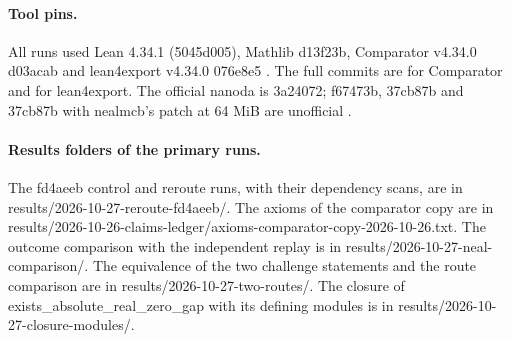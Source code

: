 \paragraph{Tool pins.}
All runs used Lean 4.34.1 (5045d005), Mathlib d13f23b, Comparator v4.34.0 d03acab and lean4export v4.34.0 076e8e5 \cite{lean4,mathlib,comparator,lean4export}. %
The full commits are  for Comparator and  for lean4export. %
The official nanoda is 3a24072; f67473b, 37cb87b and 37cb87b with nealmcb's patch at 64 MiB are unofficial \cite{nanoda-lib}. %

\paragraph{Results folders of the primary runs.}
The fd4aeeb control and reroute runs, with their dependency scans, are in results/2026-10-27-reroute-fd4aeeb/. %
The axioms of the comparator copy are in results/2026-10-26-claims-ledger/axioms-comparator-copy-2026-10-26.txt. %
The outcome comparison with the independent replay is in results/2026-10-27-neal-comparison/. %
The equivalence of the two challenge statements and the route comparison are in results/2026-10-27-two-routes/. %
The closure of exists\_absolute\_real\_zero\_gap with its defining modules is in results/2026-10-27-closure-modules/. %
